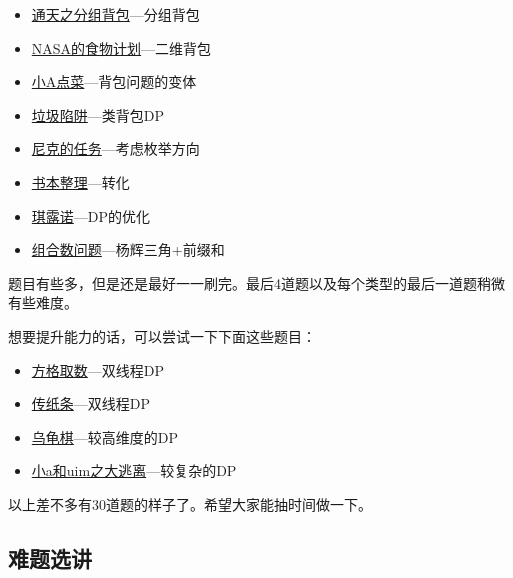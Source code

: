 \begin{itemize}
		\item{\href{https://www.luogu.org/problem/show?pid=1757}{通天之分组背包}---分组背包}
		\item{\href{https://www.luogu.org/problem/show?pid=1507}{NASA的食物计划}---二维背包}
		\item{\href{https://www.luogu.org/problem/show?pid=1164}{小A点菜}---背包问题的变体}
		\item{\href{https://www.luogu.org/problem/show?pid=1156}{垃圾陷阱}---类背包DP}
		\item{\href{https://www.luogu.org/problem/show?pid=1280}{尼克的任务}---考虑枚举方向}
		\item{\href{https://www.luogu.org/problem/show?pid=1103}{书本整理}---转化}
		\item{\href{https://www.luogu.org/problem/show?pid=1725}{琪露诺}---DP的优化}
		\item{\href{https://www.luogu.org/problem/show?pid=2822}{组合数问题}---杨辉三角+前缀和}
	\end{itemize}

	题目有些多，但是还是最好一一刷完。最后4道题以及每个类型的最后一道题稍微有些难度。

	想要提升能力的话，可以尝试一下下面这些题目：
	\begin{itemize}
		\item{\href{https://www.luogu.org/problem/show?pid=1004}{方格取数}---双线程DP}
		\item{\href{https://www.luogu.org/problem/show?pid=1006}{传纸条}---双线程DP}
		\item{\href{https://www.luogu.org/problem/show?pid=1541}{乌龟棋}---较高维度的DP}
		\item{\href{https://www.luogu.org/problem/show?pid=1373}{小a和uim之大逃离}---较复杂的DP}
	\end{itemize}

	以上差不多有30道题的样子了。希望大家能抽时间做一下。



	\newpage
	\subsection{难题选讲}
